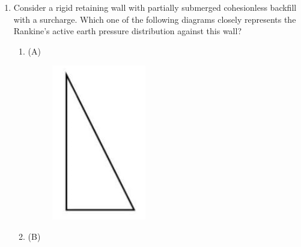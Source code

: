 \documentclass[journal,12pt,onecolumn]{article}
\theoremstyle{remark}
\begin{document}
\begin{enumerate}
    \item Consider a rigid retaining wall with partially submerged cohesionless backfill with a surcharge. Which one of the following diagrams closely represents the Rankine's active earth pressure distribution against this wall?
    \begin{multicols}{4}
    \begin{enumerate}
        \item (A) 
         \begin{figure}[H]
    \centering
    \includegraphics[width=0.7\columnwidth]{figs/image7a.jpg}  
    \caption{}
    \label{fig:1}
    \end{figure}
        \item (B) 
         \begin{figure}[H]
    \centering

\end{figure}
\end{enumerate}
\end{multicols}
\end{enumerate}
\end{document}
